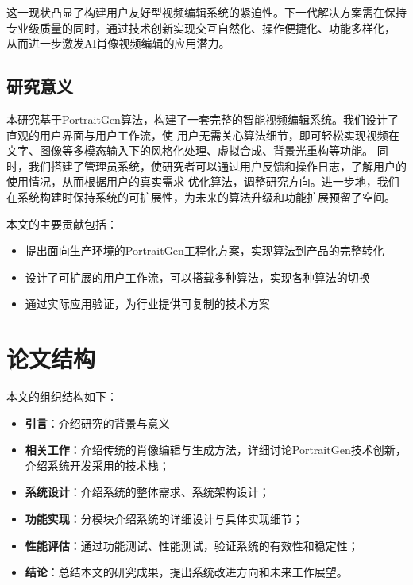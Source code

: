 这一现状凸显了构建用户友好型视频编辑系统的紧迫性。下一代解决方案需在保持专业级质量的同时，通过技术创新实现交互自然化、操作便捷化、功能多样化，
从而进一步激发AI肖像视频编辑的应用潜力。

\subsection{研究意义}

本研究基于PortraitGen算法，构建了一套完整的智能视频编辑系统。我们设计了直观的用户界面与用户工作流，使
用户无需关心算法细节，即可轻松实现视频在文字、图像等多模态输入下的风格化处理、虚拟合成、背景光重构等功能。
同时，我们搭建了管理员系统，使研究者可以通过用户反馈和操作日志，了解用户的使用情况，从而根据用户的真实需求
优化算法，调整研究方向。进一步地，我们在系统构建时保持系统的可扩展性，为未来的算法升级和功能扩展预留了空间。

本文的主要贡献包括：
\begin{itemize}
    \item 提出面向生产环境的PortraitGen工程化方案，实现算法到产品的完整转化
    \item 设计了可扩展的用户工作流，可以搭载多种算法，实现各种算法的切换
    \item 通过实际应用验证，为行业提供可复制的技术方案
\end{itemize}

\section{论文结构}

本文的组织结构如下：
\begin{itemize}
    \item \textbf{引言}：介绍研究的背景与意义
    \item \textbf{相关工作}：介绍传统的肖像编辑与生成方法，详细讨论PortraitGen技术创新，介绍系统开发采用的技术栈；
    \item \textbf{系统设计}：介绍系统的整体需求、系统架构设计；
    \item \textbf{功能实现}：分模块介绍系统的详细设计与具体实现细节；
    \item \textbf{性能评估}：通过功能测试、性能测试，验证系统的有效性和稳定性；
    \item \textbf{结论}：总结本文的研究成果，提出系统改进方向和未来工作展望。
\end{itemize}

